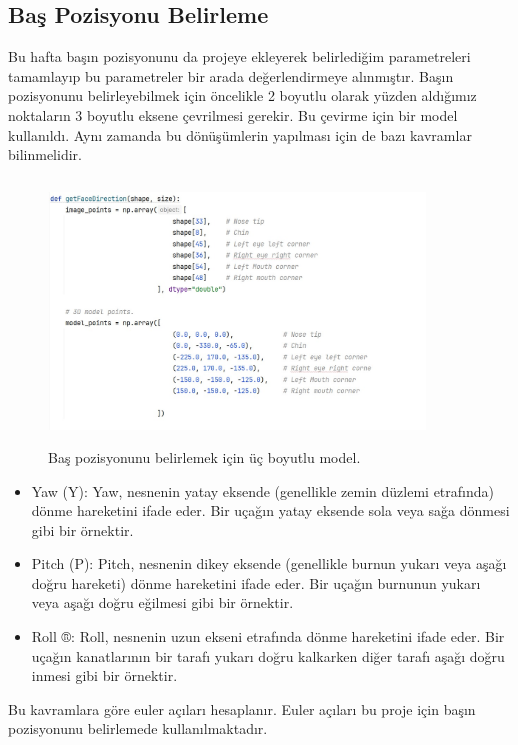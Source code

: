 \documentclass[12pt, a4paper]{article}
\begin{document}
	\subsection{ Baş Pozisyonu Belirleme }
	Bu hafta başın pozisyonunu da projeye ekleyerek belirlediğim parametreleri tamamlayıp bu parametreler bir arada değerlendirmeye alınmıştır. Başın pozisyonunu belirleyebilmek için öncelikle 2 boyutlu olarak yüzden aldığımız noktaların 3 boyutlu eksene çevrilmesi gerekir. Bu çevirme için bir model kullanıldı. Aynı zamanda bu dönüşümlerin yapılması için de bazı kavramlar bilinmelidir. 
	\begin{figure}[htbp]
		\centering
		\includegraphics[width=10cm, height=7cm, keepaspectratio]{bastanimlama.jpg}
		\caption{Baş pozisyonunu belirlemek için üç boyutlu model\cite{neelan}.}
	\end{figure}
	\begin{itemize}
		\item Yaw (Y): Yaw, nesnenin yatay eksende (genellikle zemin düzlemi etrafında) dönme hareketini ifade eder. Bir uçağın yatay eksende sola veya sağa dönmesi gibi bir örnektir.
		\item Pitch (P): Pitch, nesnenin dikey eksende (genellikle burnun yukarı veya aşağı doğru hareketi) dönme hareketini ifade eder. Bir uçağın burnunun yukarı veya aşağı doğru eğilmesi gibi bir örnektir.
		\item Roll ®: Roll, nesnenin uzun ekseni etrafında dönme hareketini ifade eder. Bir uçağın kanatlarının bir tarafı yukarı doğru kalkarken diğer tarafı aşağı doğru inmesi gibi bir örnektir.
	\end{itemize}
	Bu kavramlara göre euler açıları hesaplanır. Euler açıları bu proje için başın pozisyonunu belirlemede kullanılmaktadır.
\end{document}
